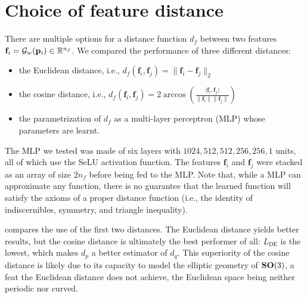 \section{Choice of feature distance}\label{apx:feature-distance}


There are multiple options for a distance function $d_f$ between two features $\mathbf{f}_i = \mathcal{G}_w(\mathbf{p}_i) \in \mathbb{R}^{n_f}$. We compared the performance of three different distances: 

\begin{itemize}
    \item the Euclidean distance, i.e., $d_f(\mathbf{f}_i, \mathbf{f}_j) = \| \mathbf{f}_i - \mathbf{f}_j \|_2$
    \item the cosine distance, i.e.,
$ d_f(\mathbf{f}_i,\mathbf{f}_j) = 2 \arccos \left( \frac{\langle \mathbf{f}_i, \mathbf{f}_j \rangle}{\lVert \mathbf{f}_i \rVert \lVert \mathbf{f}_j \rVert} \right)$
    \item the parametrization of $d_f$ as a multi-layer perceptron (MLP) whose parameters are learnt. 
\end{itemize}

The MLP we tested was made of six layers with $1024, 512, 512, 256, 256, 1$ units, all of which use the SeLU activation function. The features $\mathbf{f}_i$ and $\mathbf{f}_j$ were stacked as an array of size $2n_f$ before being fed to the MLP. Note that, while a MLP can approximate any function, there is no guarantee that the learned function will satisfy the axioms of a proper distance function (i.e., the identity of indiscernibles, symmetry, and triangle inequality). 

 compares the use of the first two distances. The Euclidean distance yields better results, but the cosine distance is ultimately the best performer of all: $L_\text{DE}$ is the lowest, which makes $d_p$ a better estimator of $d_q$.
This superiority of the cosine distance is likely due to its capacity to model the elliptic geometry of $\mathrm{\mathbf{SO}}(3)$, a feat the Euclidean distance does not achieve, the Euclidean space being neither periodic nor curved.

